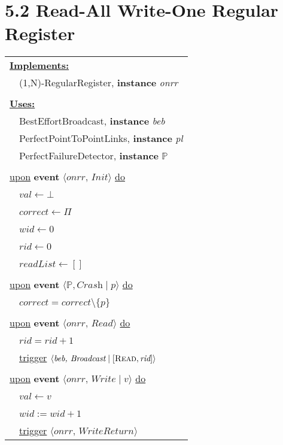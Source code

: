 \documentclass{article}
\begin{document}
	\section*{5.2 Read-All Write-One Regular Register}
	\begin{adjustwidth}{2em}{2em}
		\begin{center}
			\begin{tabular}{l}
				\underline{\textbf{Implements:}} \\
				\ \ (1,N)-RegularRegister, \textbf{instance} \textit{onrr} \\
				\\ 
				\underline{\textbf{Uses:}} \\
				\ \ BestEffortBroadcast, \textbf{instance} \textit{beb} \\
				\ \ PerfectPointToPointLinks, \textbf{instance} \textit{pl} \\
				\ \ PerfectFailureDetector, \textbf{instance} $\mathbb{P}$ \\
				\\
				\underline{upon} \textbf{event} $\langle \textit{onrr, Init} \rangle$ \underline{do} \\ 
				\ \ $val \leftarrow \bot$ \\
				\ \ $correct \leftarrow \Pi$ \\
				\ \ $wid \leftarrow 0$ \\
				\ \ $rid \leftarrow 0$ \\
				\ \ $readList \leftarrow []$ \\
				\\
				\underline{upon} \textbf{event} $\langle \mathbb{P}, \textit{Crash} \mid p \rangle$ \underline{do} \\
				\ \ $correct = correct \setminus \{ p \}$ \\
				\\
				\underline{upon} \textbf{event} $\langle \textit{onrr, Read} \rangle$ \underline{do} \\
				\ \ $rid = rid + 1$ \\
				\ \ \underline{trigger} $\langle \textit{beb, Broadcast} \mid [\textsc{Read}, \textit{rid}] \rangle$ \\
				\\
				\underline{upon} \textbf{event} $\langle \textit{onrr, Write} \mid v \rangle$ \underline{do} \\
				\ \ $val \leftarrow v$ \\
				\ \ $wid := wid + 1$ \\
				\ \ \underline{trigger} $\langle \textit{onrr, WriteReturn} \rangle$ \\

\end{tabular}
\end{center}
\end{adjustwidth}
\end{document}
